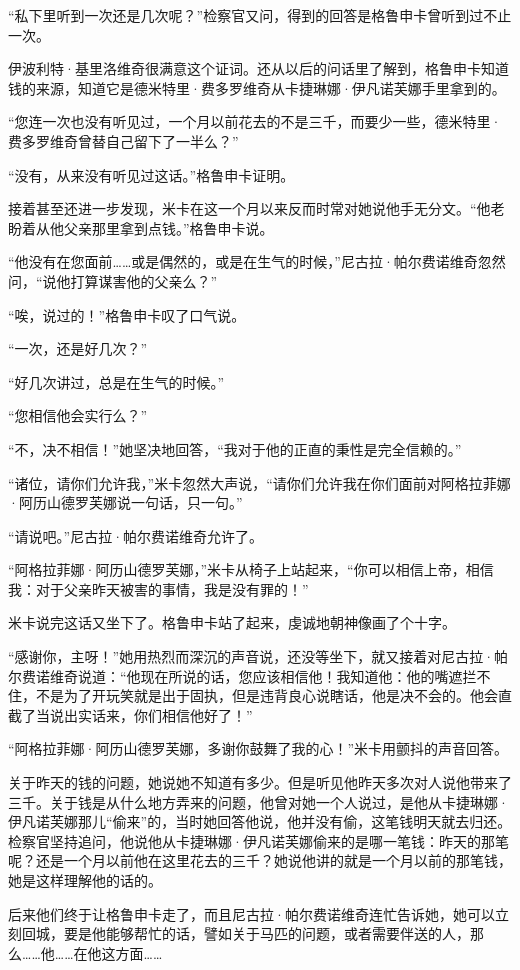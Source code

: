 \par “私下里听到一次还是几次呢？”检察官又问，得到的回答是格鲁申卡曾听到过不止一次。
\par 伊波利特·基里洛维奇很满意这个证词。还从以后的问话里了解到，格鲁申卡知道钱的来源，知道它是德米特里·费多罗维奇从卡捷琳娜·伊凡诺芙娜手里拿到的。
\par “您连一次也没有听见过，一个月以前花去的不是三千，而要少一些，德米特里·费多罗维奇曾替自己留下了一半么？”
\par “没有，从来没有听见过这话。”格鲁申卡证明。
\par 接着甚至还进一步发现，米卡在这一个月以来反而时常对她说他手无分文。“他老盼着从他父亲那里拿到点钱。”格鲁申卡说。
\par “他没有在您面前……或是偶然的，或是在生气的时候，”尼古拉·帕尔费诺维奇忽然问，“说他打算谋害他的父亲么？”
\par “唉，说过的！”格鲁申卡叹了口气说。
\par “一次，还是好几次？”
\par “好几次讲过，总是在生气的时候。”
\par “您相信他会实行么？”
\par “不，决不相信！”她坚决地回答，“我对于他的正直的秉性是完全信赖的。”
\par “诸位，请你们允许我，”米卡忽然大声说，“请你们允许我在你们面前对阿格拉菲娜·阿历山德罗芙娜说一句话，只一句。”
\par “请说吧。”尼古拉·帕尔费诺维奇允许了。
\par “阿格拉菲娜·阿历山德罗芙娜，”米卡从椅子上站起来，“你可以相信上帝，相信我：对于父亲昨天被害的事情，我是没有罪的！”
\par 米卡说完这话又坐下了。格鲁申卡站了起来，虔诚地朝神像画了个十字。
\par “感谢你，主呀！”她用热烈而深沉的声音说，还没等坐下，就又接着对尼古拉·帕尔费诺维奇说道：“他现在所说的话，您应该相信他！我知道他：他的嘴遮拦不住，不是为了开玩笑就是出于固执，但是违背良心说瞎话，他是决不会的。他会直截了当说出实话来，你们相信他好了！”
\par “阿格拉菲娜·阿历山德罗芙娜，多谢你鼓舞了我的心！”米卡用颤抖的声音回答。
\par 关于昨天的钱的问题，她说她不知道有多少。但是听见他昨天多次对人说他带来了三千。关于钱是从什么地方弄来的问题，他曾对她一个人说过，是他从卡捷琳娜·伊凡诺芙娜那儿“偷来”的，当时她回答他说，他并没有偷，这笔钱明天就去归还。检察官坚持追问，他说他从卡捷琳娜·伊凡诺芙娜偷来的是哪一笔钱：昨天的那笔呢？还是一个月以前他在这里花去的三千？她说他讲的就是一个月以前的那笔钱，她是这样理解他的话的。
\par 后来他们终于让格鲁申卡走了，而且尼古拉·帕尔费诺维奇连忙告诉她，她可以立刻回城，要是他能够帮忙的话，譬如关于马匹的问题，或者需要伴送的人，那么……他……在他这方面……
